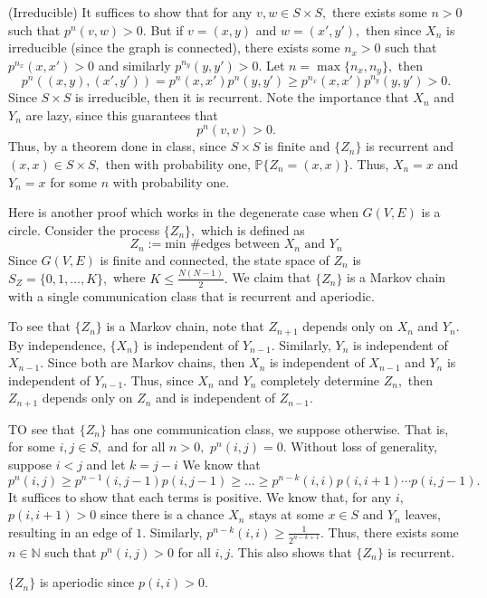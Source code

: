 \documentclass[11pt]{article}
\newcommand{\bbN}{\mathbb{N}}
\newcommand{\bbP}{\mathbb{P}}
\begin{document}
\begin{problem}
\begin{solution}
(Irreducible) It suffices to show that for any $v, w \in S \times S,$ there exists some $n >0$ such that $p^n(v,w) >0.$ But if $v =(x,y)$ and $w = (x', y'),$ then since $X_n$ is irreducible (since the graph is connected), there exists some $n_x>0$ such that $p^{n_x}(x,x')>0$ and similarly $p^{n_y}(y,y')>0.$ Let $n = \max\{n_x, n_y\},$ then 
\[p^n((x, y), (x', y')) = p^n(x,x') p^n(y,y') \geq p^{n_x}(x,x') p^{n_y}(y,y') >0.\] Since $S \times S$ is irreducible, then it is recurrent. Note the importance that $X_n$ and $Y_n$ are lazy, since this guarantees that 
\[p^n(v,v) >0.\]
Thus, by a theorem done in class, since $S\times S$ is finite and $\{Z_n\}$ is recurrent and $(x,x) \in S \times S,$ then with probability one, $\bbP\{Z_n = (x,x)\}.$ Thus, $X_n = x$ and $Y_n = x$ for some $n$ with probability one.




Here is another proof which works in the degenerate case when $G(V,E)$ is a circle.
 Consider the process $\{Z_n\},$ which is defined as
\[Z_n := \text{min \# edges between $X_n$ and $Y_n$}\]
Since $G(V,E)$ is finite and connected, the state space of $Z_n$ is $S_Z = \{0, 1, \dots, K\},$ where $K\leq \frac{N(N-1)}{2}.$ We claim that $\{Z_n\}$ is a Markov chain with a single communication class that is recurrent and aperiodic. 

To see that $\{Z_n\}$ is a Markov chain, note that $Z_{n+1}$ depends only on $X_{n}$ and $Y_{n}.$ By independence, $\{X_n\}$ is independent of $Y_{n-1}.$  Similarly, $Y_{n}$ is independent of $X_{n-1}.$ Since both are Markov chains, then $X_n$ is independent of $X_{n-1}$ and $Y_n$ is independent of $Y_{n-1}.$ Thus, since $X_n$ and $Y_n$ completely determine $Z_n,$ then $Z_{n + 1}$ depends only on $Z_n$ and is independent of $Z_{n-1}.$ 

TO see that $\{Z_n\}$ has one communication class, we suppose otherwise. That is, for some $i,j \in S,$ and for all $n>0,$ $p^n(i,j)  =  0.$ Without loss of generality, suppose $i<j$ and let $k = j-i$ We know that 
$p^n(i,j) \geq p^{n-1}(i,{j-1})p(i,j-1) \geq \dots \geq p^{n-k}(i,i)p(i,i + 1)\cdots p(i,j-1).$ It suffices to show that each terms is positive. We know that, for any $i,$
$p(i, i + 1) >0$ since there is a chance $X_n$ stays at some $x \in S$ and $Y_n$ leaves, resulting in an edge of $1.$ Similarly, $p^{n-k}(i,i) \geq \frac{1}{2^{n-k +1}}.$ Thus, there exists some $n \in \bbN$ such that $p^n(i,j) >0$ for all $i,j.$ This also shows that $\{Z_n\}$ is recurrent.

$\{Z_n\}$ is aperiodic since $p(i,i) >0.$ 


\end{solution}
\end{problem}
\end{document}

